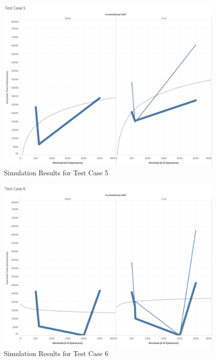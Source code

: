 \begin{figure}
\centering
\includegraphics[scale=0.23]{images/TestCase5(WL).png}
\caption{Simulation Results for Test Case 5}
\label{results:test_case_graphs_5}
\end{figure}

\begin{figure}
\centering
\includegraphics[scale=0.20]{images/TestCase6(WL).png}
\caption{Simulation Results for Test Case 6}
\label{results:test_case_graphs_6}
\end{figure}


